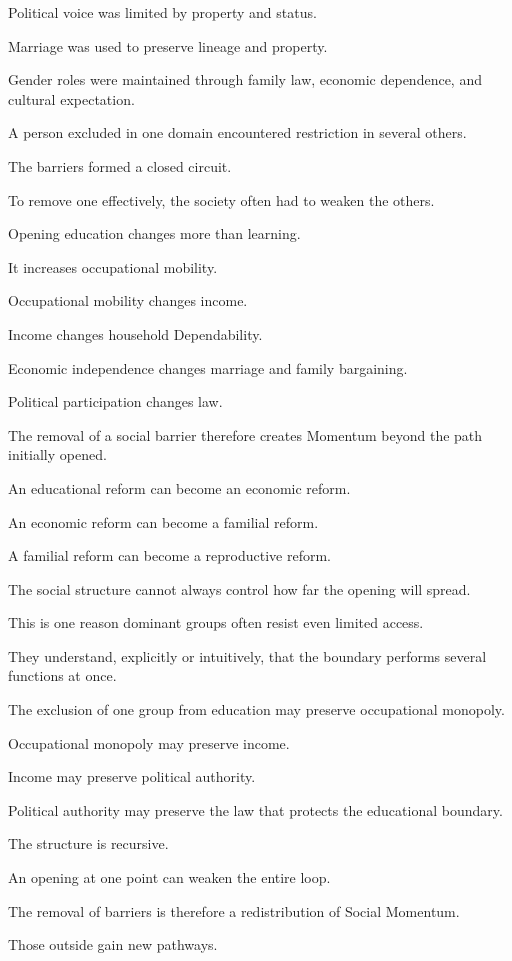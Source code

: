 Political voice was limited by property and status.

Marriage was used to preserve lineage and property.

Gender roles were maintained through family law, economic dependence, and cultural expectation.

A person excluded in one domain encountered restriction in several others.

The barriers formed a closed circuit.

To remove one effectively, the society often had to weaken the others.

Opening education changes more than learning.

It increases occupational mobility.

Occupational mobility changes income.

Income changes household Dependability.

Economic independence changes marriage and family bargaining.

Political participation changes law.

The removal of a social barrier therefore creates Momentum beyond the path initially opened.

An educational reform can become an economic reform.

An economic reform can become a familial reform.

A familial reform can become a reproductive reform.

The social structure cannot always control how far the opening will spread.

This is one reason dominant groups often resist even limited access.

They understand, explicitly or intuitively, that the boundary performs several functions at once.

The exclusion of one group from education may preserve occupational monopoly.

Occupational monopoly may preserve income.

Income may preserve political authority.

Political authority may preserve the law that protects the educational boundary.

The structure is recursive.

An opening at one point can weaken the entire loop.

The removal of barriers is therefore a redistribution of Social Momentum.

Those outside gain new pathways.

